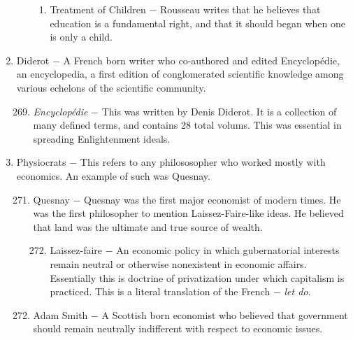 \documentclass[12pt]{article}
\begin{document}
\begin{enumerate}
\begin{enumerate}[label=\arabic{*}.]
\begin{enumerate}[label=\arabic{*}.]
\item Treatment of Children $-$ Rousseau writes that he believes that education is a fundamental right, and that it should began when one is only a child.

\end{enumerate}
\end{enumerate}
\setcounter{enumi}{267}

\item Diderot $-$ A French born writer who co-authored and edited Encyclop\'edie, an encyclopedia, a first edition of conglomerated scientific knowledge among various echelons of the scientific community.

\begin{enumerate}[label=\arabic{*}.]
\setcounter{enumii}{268}

\item \textit{Encyclop\'edie} $-$ This was written by Denis Diderot. It is a collection of many defined terms, and contains 28 total volums. This was essential in spreading Enlightenment ideals.

\end{enumerate}
\setcounter{enumi}{269}

\item Physiocrats $-$ This refers to any philososopher who worked mostly with economics. An example of such was Quesnay.

\begin{enumerate}[label=\arabic{*}.]
\setcounter{enumii}{270}

\item Quesnay $-$ Quesnay was the first major economist of modern times. He was the first philosopher to mention Laissez-Faire-like ideas. He believed that land was the ultimate and true source of wealth.

\begin{enumerate}[label=\arabic{*}.]
\setcounter{enumiii}{271}

\item Laissez-faire $-$ An economic policy in which gubernatorial interests remain neutral or otherwise nonexistent in economic affairs. Essentially this is doctrine of privatization under which capitalism is practiced. This is a literal translation of the French $-$ \textit{let do}.

\end{enumerate}
\setcounter{enumii}{272}

\item Adam Smith $-$ A Scottish born economist who believed that government should remain neutrally indifferent with respect to economic issues.


\end{enumerate}
\end{enumerate}
\end{document}
